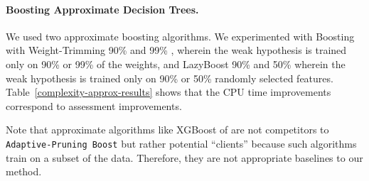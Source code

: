 

\paragraph{Boosting Approximate Decision Trees.}
We used two approximate boosting algorithms.
We experimented with Boosting with Weight-Trimming 90\% and 99\% \citep{Friedman98additivelogistic}, wherein the weak hypothesis is trained only on 90\% or 99\% of the weights, and LazyBoost 90\% and 50\% \citep{Escudero:2001:ULW:2387364.2387381} wherein the weak hypothesis is trained only on 90\% or 50\% randomly selected features. Table~\ref{complexity-approx-results} shows that the CPU time improvements correspond to assessment improvements.

Note that approximate algorithms like XGBoost of \cite{Chen:2016:XST:2939672.2939785} are not competitors to \texttt{Adaptive-Pruning Boost} but rather potential ``clients'' because such algorithms train on a subset of the data. Therefore, they are not appropriate baselines to our method.



